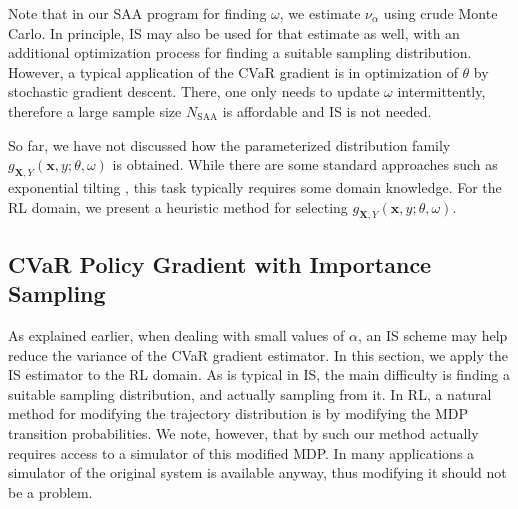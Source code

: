 \documentclass[letterpaper]{article}
\newcommand{\var}{\nu_\alpha}
\newcommand{\bx}{\mathbf{x}}
\newcommand{\bX}{\mathbf{X}}
\begin{document}
Note that in our SAA program for finding $\omega$, we estimate $\var$ using crude Monte Carlo. In principle, IS may also be used for that estimate as well, with an additional optimization process for finding a suitable sampling distribution. However, a typical application of the CVaR gradient is in optimization of $\theta$ by stochastic gradient descent. There, one only needs to update $\omega$ intermittently, therefore a large sample size $N_{\textrm{SAA}}$ is affordable and IS is not needed.

So far, we have not discussed how the parameterized distribution family $g_{\bX,Y}\left(\bx,y;\theta,\omega\right)$ is obtained. While there are some standard approaches such as exponential tilting \cite{rubinstein2011simulation}, this task typically requires some domain knowledge.
For the RL domain, we present a heuristic method for selecting $g_{\bX,Y}\left(\bx,y;\theta,\omega\right)$.

\subsection{CVaR Policy Gradient with Importance Sampling}\label{sec:CVaR_PG_IS}

As explained earlier, when dealing with small values of $\alpha$, an IS scheme may help reduce the variance of the CVaR gradient estimator. In this section, we apply the IS estimator to the RL domain. As is typical in IS, the main difficulty is finding a suitable sampling distribution, and actually sampling from it. In RL, a natural method for modifying the trajectory distribution is by modifying the MDP transition probabilities. We note, however, that by such our method actually requires access to a simulator of this modified MDP. In many applications a simulator of the original system is available anyway, thus modifying it should not be a problem.
\end{document}
